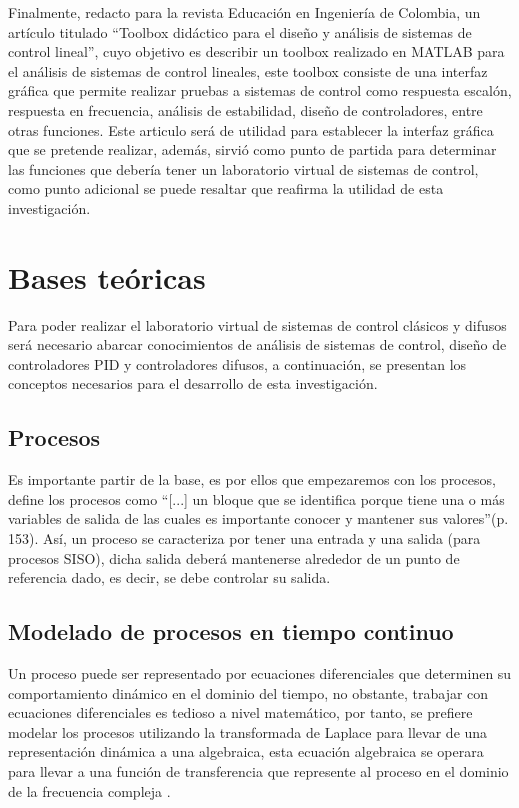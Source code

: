 	Finalmente, \textcite{cadavid2009toolbox} redacto para la revista Educación en Ingeniería de Colombia, un artículo titulado \enquote{Toolbox didáctico para el diseño y análisis de sistemas de control lineal}, cuyo objetivo es describir un toolbox realizado en MATLAB para el análisis de sistemas de control lineales, este toolbox consiste de una interfaz gráfica que permite realizar pruebas a sistemas de control como respuesta escalón, respuesta en frecuencia, análisis de estabilidad, diseño de controladores, entre otras funciones. Este articulo será de utilidad para establecer la interfaz gráfica que se pretende realizar, además, sirvió como punto de partida para determinar las funciones que debería tener un laboratorio virtual de sistemas de control, como punto adicional se puede resaltar que reafirma la utilidad de esta investigación. 
	
\section{Bases teóricas}
	
    Para poder realizar el laboratorio virtual de sistemas de control clásicos y difusos será necesario abarcar conocimientos de análisis de sistemas de control, diseño de controladores PID y controladores difusos, a continuación, se presentan los conceptos necesarios para el desarrollo de esta investigación.
    
    \subsection{Procesos}
		
		Es importante partir de la base, es por ellos que empezaremos con los procesos, \textcite{sanchez2003control} define los procesos como \enquote{[...] un bloque que se identifica porque tiene una o más variables de salida de las cuales es importante conocer y mantener sus valores}(p.$\,$153). Así, un proceso se caracteriza por tener una entrada y una salida (para procesos SISO), dicha salida deberá mantenerse alrededor de un punto de referencia dado, es decir, se debe controlar su salida.
	
	\subsection{Modelado de procesos en tiempo continuo}
	
		Un proceso puede ser representado por ecuaciones diferenciales que determinen su comportamiento dinámico en el dominio del tiempo, no obstante, trabajar con ecuaciones diferenciales es tedioso a nivel matemático, por tanto, se prefiere modelar los procesos utilizando la transformada de Laplace para llevar de una representación dinámica a una algebraica, esta ecuación algebraica se operara para llevar a una función de transferencia que represente al proceso en el dominio de la frecuencia compleja \Parencite{smith1985principles}.
	
